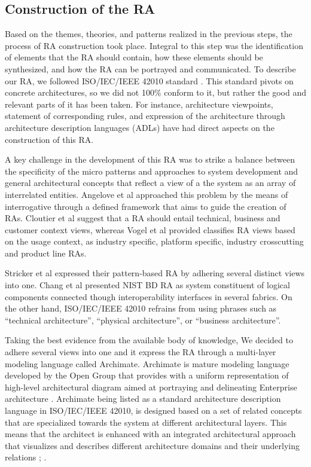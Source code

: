 \documentclass[review]{elsarticle}
\begin{document}
\subsection{Construction of the RA}

Based on the themes, theories, and patterns realized in the previous steps, the process of RA construction took place. Integral to this step was the identification of elements that the RA should contain, how these elements should be synthesized, and how the RA can be portrayed and communicated. To describe our RA, we followed ISO/IEC/IEEE 42010 standard \cite{ISO42010}. This standard pivots on concrete architectures, so we did not 100\% conform to it, but rather the good and relevant parts of it has been taken. For instance, architecture viewpoints, statement of corresponding rules, and expression of the architecture through architecture description languages (ADLs) have had direct aspects on the construction of this RA.

A key challenge in the development of this RA was to strike a balance between the specificity of the micro patterns and approaches to system development and general architectural concepts that reflect a view of a the system as an array of interrelated entities. Angelove et al \cite{angelov2012framework} approached this problem by the means of interrogative through a defined framework that aims to guide the creation of RAs.
Cloutier et al \cite{Cloutier} suggest that a RA should entail technical, business and customer context views, whereas Vogel et al \cite{vogel2009software} provided classifies RA views based on the usage context, as industry specific, platform specific, industry crosscutting and product line RAs. 

Stricker et al \cite{Stricker} expressed their pattern-based RA by adhering several distinct views into one. Chang et al \cite{Chang} presented NIST BD RA as system constituent of logical components connected though interoperability interfaces in several fabrics. On the other hand, ISO/IEC/IEEE 42010 refrains from using phrases such as “technical architecture”, “physical architecture”, or “business architecture”. 

Taking the best evidence from the available body of knowledge, We decided to adhere several views into one and it express the RA through a multi-layer modeling language called Archimate. Archimate is mature modeling language developed by the Open Group that provides with a uniform representation of high-level architectural diagram aimed at portraying and delineating Enterprise architecture \cite{lankhorst2013language}. Archimate being listed as a standard architecture description language in ISO/IEC/IEEE 42010, is designed based on a set of related concepts that are specialized towards the system at different architectural layers. This means that the architect is enhanced with an integrated architectural approach that visualizes and describes different architecture domains and their underlying relations \cite{lankhorst2010anatomy}; \cite{engelsman2011extending}. 
\end{document}
